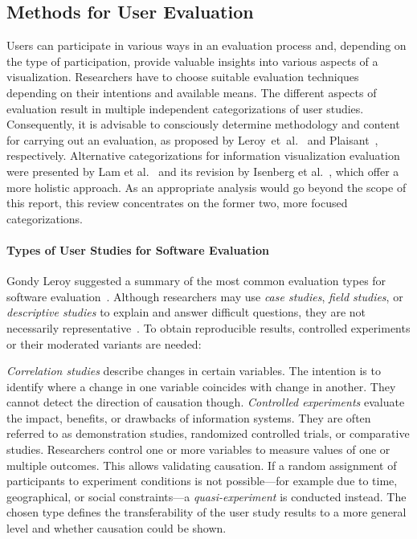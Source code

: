 \documentclass[sigconf,
natbib=true]{acmart}
\begin{document}
\subsection{Methods for User Evaluation}
Users can participate in various ways in an evaluation process and, depending on the type of participation, provide valuable insights into various aspects of a visualization.
Researchers have to choose suitable evaluation techniques depending on their intentions and available means.
The different aspects of evaluation result in multiple independent categorizations of user studies.
Consequently, it is advisable to consciously determine methodology and content for carrying out an evaluation, as proposed by Leroy~et~al.~\cite{leroy2011-designing} and Plaisant~\cite{plaisant2004-evaluation}, respectively. 
Alternative categorizations for information visualization evaluation were presented by Lam et al.~\cite{lam2012-empirical} and its revision by Isenberg et al.~\cite{isenberg2013-review}, which offer a more holistic approach.
As an appropriate analysis would go beyond the scope of this report, this review concentrates on the former two, more focused categorizations.

\paragraph{\textbf{Types of User Studies for Software Evaluation}}
Gondy Leroy suggested a summary of the most common evaluation types for software evaluation~\cite{leroy2011-designing}.
Although researchers may use \emph{case studies}, \emph{field studies}, or \emph{descriptive studies} to explain and answer difficult questions, they are not necessarily representative~\cite{plaisant2004-evaluation}. To obtain reproducible results, controlled experiments or their moderated variants are needed:
\par
\emph{Correlation studies} describe changes in certain variables. 
The intention is to identify where a change in one variable coincides with change in another.
They cannot detect the direction of causation though.
\emph{Controlled experiments} evaluate the impact, benefits, or drawbacks of information systems.
They are often referred to as demonstration studies, randomized controlled trials, or comparative studies.
Researchers control one or more variables to measure values of one or multiple outcomes. 
This allows validating causation.
If a random assignment of participants to experiment conditions is not possible---for example due to time, geographical, or social constraints---a \emph{quasi-experiment} is conducted instead.
The chosen type defines the transferability of the user study results to a more general level and whether causation could be shown.
\end{document}
